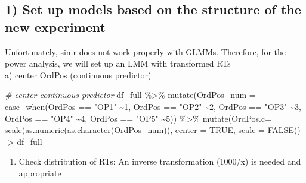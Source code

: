 \documentclass[
]{article}
\newenvironment{Shaded}{\begin{snugshade}}{\end{snugshade}}
\newcommand{\AttributeTok}[1]{\textcolor[rgb]{0.77,0.63,0.00}{#1}}
\newcommand{\CommentTok}[1]{\textcolor[rgb]{0.56,0.35,0.01}{\textit{#1}}}
\newcommand{\ConstantTok}[1]{\textcolor[rgb]{0.00,0.00,0.00}{#1}}
\newcommand{\DecValTok}[1]{\textcolor[rgb]{0.00,0.00,0.81}{#1}}
\newcommand{\FunctionTok}[1]{\textcolor[rgb]{0.00,0.00,0.00}{#1}}
\newcommand{\NormalTok}[1]{#1}
\newcommand{\OtherTok}[1]{\textcolor[rgb]{0.56,0.35,0.01}{#1}}
\newcommand{\SpecialCharTok}[1]{\textcolor[rgb]{0.00,0.00,0.00}{#1}}
\newcommand{\StringTok}[1]{\textcolor[rgb]{0.31,0.60,0.02}{#1}}
\providecommand{\tightlist}{%
  \setlength{\itemsep}{0pt}\setlength{\parskip}{0pt}}
\begin{document}
\hypertarget{set-up-models-based-on-the-structure-of-the-new-experiment}{%
\subsection{1) Set up models based on the structure of the new
experiment}\label{set-up-models-based-on-the-structure-of-the-new-experiment}}

Unfortunately, simr does not work properly with GLMMs. Therefore, for
the power analysis, we will set up an LMM with transformed RTs\\
a) center OrdPos (continuous predictor)

\begin{Shaded}
\begin{Highlighting}[]
\CommentTok{\# center continuous predictor}
\NormalTok{df\_full }\SpecialCharTok{\%\textgreater{}\%} \FunctionTok{mutate}\NormalTok{(}\AttributeTok{OrdPos\_num =} \FunctionTok{case\_when}\NormalTok{(OrdPos }\SpecialCharTok{==} \StringTok{"OP1"} \SpecialCharTok{\textasciitilde{}}\DecValTok{1}\NormalTok{,}
\NormalTok{                                         OrdPos }\SpecialCharTok{==} \StringTok{"OP2"} \SpecialCharTok{\textasciitilde{}}\DecValTok{2}\NormalTok{,}
\NormalTok{                                         OrdPos }\SpecialCharTok{==} \StringTok{"OP3"} \SpecialCharTok{\textasciitilde{}}\DecValTok{3}\NormalTok{,}
\NormalTok{                                         OrdPos }\SpecialCharTok{==} \StringTok{"OP4"} \SpecialCharTok{\textasciitilde{}}\DecValTok{4}\NormalTok{,}
\NormalTok{                                         OrdPos }\SpecialCharTok{==} \StringTok{"OP5"} \SpecialCharTok{\textasciitilde{}}\DecValTok{5}\NormalTok{)) }\SpecialCharTok{\%\textgreater{}\%}
                  \FunctionTok{mutate}\NormalTok{(}\AttributeTok{OrdPos.c=}
                    \FunctionTok{scale}\NormalTok{(}\FunctionTok{as.numeric}\NormalTok{(}\FunctionTok{as.character}\NormalTok{(OrdPos\_num)), }
                     \AttributeTok{center =} \ConstantTok{TRUE}\NormalTok{, }\AttributeTok{scale =} \ConstantTok{FALSE}\NormalTok{)) }\OtherTok{{-}\textgreater{}}\NormalTok{ df\_full}
\end{Highlighting}
\end{Shaded}

\begin{enumerate}
\def\labelenumi{\alph{enumi})}
\setcounter{enumi}{1}
\tightlist
\item
  Check distribution of RTs: An inverse transformation (1000/x) is
  needed and appropriate
\end{enumerate}
\end{document}
